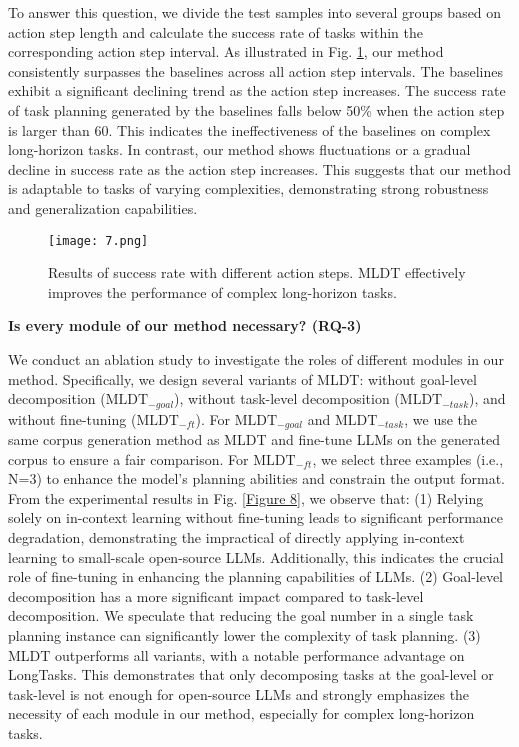 To answer this question, we divide the test samples into several groups based on action step length and calculate the success rate of tasks within the corresponding action step interval. As illustrated in Fig. \ref{Figure 7}, our method consistently surpasses the baselines across all action step intervals. The baselines exhibit a significant declining trend as the action step increases. The success rate of task planning generated by the baselines falls below 50\% when the action step is larger than 60. This indicates the ineffectiveness of the baselines on complex long-horizon tasks. In contrast, our method shows fluctuations or a gradual decline in success rate as the action step increases. This suggests that our method is adaptable to tasks of varying complexities, demonstrating strong robustness and generalization capabilities.\\

\begin{figure}[h]
    \centering
    \texttt{[image: 7.png]}
    \caption{Results of success rate with different action steps. MLDT effectively improves the performance of complex long-horizon tasks.}
    \label{Figure 7}
\end{figure}

\noindent \textbf{Is every module of our method necessary? (RQ-3)}

We conduct an ablation study to investigate the roles of different modules in our method. Specifically, we design several variants of MLDT: without goal-level decomposition ($\mathrm{MLDT}_{-goal}$), without task-level decomposition ($\mathrm{MLDT}_{-task}$), and without fine-tuning ($\mathrm{MLDT}_{-ft}$). For $\mathrm{MLDT}_{-goal}$ and $\mathrm{MLDT}_{-task}$, we use the same corpus generation method as MLDT and fine-tune LLMs on the generated corpus to ensure a fair comparison. For $\mathrm{MLDT}_{-ft}$, we select three examples (i.e., N=3) to enhance the model's planning abilities and constrain the output format. From the experimental results in Fig. \ref{Figure 8}, we observe that: (1) Relying solely on in-context learning without fine-tuning leads to significant performance degradation, demonstrating the impractical of directly applying in-context learning to small-scale open-source LLMs. Additionally, this indicates the crucial role of fine-tuning in enhancing the planning capabilities of LLMs. (2) Goal-level decomposition has a more significant impact compared to task-level decomposition. We speculate that reducing the goal number in a single task planning instance can significantly lower the complexity of task planning. (3) MLDT outperforms all variants, with a notable performance advantage on LongTasks. This demonstrates that only decomposing tasks at the goal-level or task-level is not enough for open-source LLMs and strongly emphasizes the necessity of each module in our method, especially for complex long-horizon tasks.

